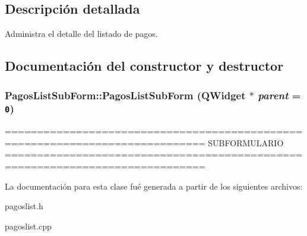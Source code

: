 \subsection{Descripci\'{o}n detallada}
Administra el detalle del listado de pagos. 



\subsection{Documentaci\'{o}n del constructor y destructor}
\subsubsection{\setlength{\rightskip}{0pt plus 5cm}Pagos\-List\-Sub\-Form::Pagos\-List\-Sub\-Form (QWidget $\ast$ {\em parent} = {\tt 0})}\label{classPagosListSubForm_a0}


============================================================================= SUBFORMULARIO ============================================================================= 

La documentaci\'{o}n para esta clase fu\'{e} generada a partir de los siguientes archivos:\begin{CompactItemize}
\item 
pagoslist.h\item 
pagoslist.cpp\end{CompactItemize}
